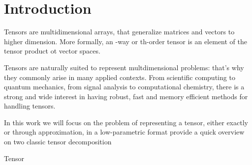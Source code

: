\chapter{Introduction}
Tensors are multidimensional arrays, that generalize matrices and vectors to higher dimension. More formally, an \N-way or \N th-order tensor is an element of the tensor product ot \N vector spaces.

Tensors are naturally suited to represent multdimensional problems: that's why they commonly arise in many applied contexts. From scientific computing to quantum mechanics, from signal analysis to computational chemistry, there is a strong and wide interest in having robust, fast and memory efficient methods for handling tensors.

In this work we will focus on the problem of representing a tensor, either exactly or through approximation, in a low-parametric format
provide a quick overview on two classic tensor decomposition

Tensor 

